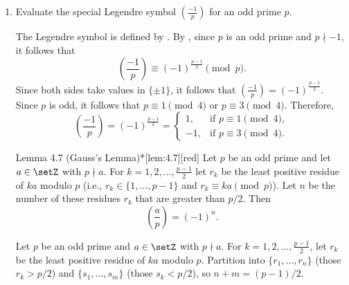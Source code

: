 \begin{enumerate}
  \newpage
  \begin{define}{Theorem 4.4 (Euler's Criterion)*}[thm:4.4][red]
    Let $p$ be an odd prime and let $a\in\setZ$ with $p\nmid a$. Then
    \[
    \left(\frac{a}{p}\right) \equiv a^{\frac{p-1}{2}} \pmod p,
    \]
    and, since both sides take values in $\{\pm1\}$, we may (and usually do) interpret this congruence as the equality
    \[
    \left(\frac{a}{p}\right) = a^{\frac{p-1}{2}} \pmod p \in\{1,-1\}.
    \]
    \begin{subprove}
      If $\left(\frac{a}{p}\right)=1$, there exists $x_0$ with $x_0^2\equiv a\pmod p$. Then
      \[
      a^{\frac{p-1}{2}} \equiv (x_0^2)^{\frac{p-1}{2}} \equiv x_0^{\,p-1}\equiv 1\pmod p
      \]
      by Fermat's little theorem.
      If $\left(\frac{a}{p}\right)=-1$, the nonzero residues $\{1,2,\dots,p-1\}$ partition into $(p-1)/2$ pairs with product $a$: if $i^2\equiv a\pmod p$ for some $i$, then $a$ is a residue, contradiction. Hence $(p-1)!\equiv a^{\frac{p-1}{2}} \pmod p$. By Wilson's theorem, $(p-1)!\equiv -1\pmod p$, so $a^{\frac{p-1}{2}}\equiv -1\pmod p$.
    \end{subprove}
  \end{define}
  \item\label{thm:4.6} Evaluate the special Legendre symbol $\left(\frac{-1}{p}\right)$ for an odd prime $p$.
  \begin{subprove}
    The Legendre symbol is defined by .
    By , since $p$ is an odd prime and $p \nmid -1$, it follows that
    \[
    \left(\frac{-1}{p}\right)\equiv (-1)^{\frac{p-1}{2}}\pmod p.
    \]
    Since both sides take values in $\{\pm1\}$, it follows that $\left(\frac{-1}{p}\right)=(-1)^{\frac{p-1}{2}}$.
    Since $p$ is odd, it follows that $p \equiv 1 \pmod{4}$ or $p \equiv 3 \pmod{4}$.
    Therefore, 
      \[
      \left(\frac{-1}{p}\right)=(-1)^{\frac{p-1}{2}}=
      \begin{cases}
      1, & \text{if } p\equiv 1\pmod 4,\\[4pt]
      -1,& \text{if } p\equiv 3\pmod 4.
      \end{cases}
      \]
  \end{subprove}




  \newpage
  \begin{define}{Lemma 4.7 (Gauss's Lemma)*}[lem:4.7][red]
    Let $p$ be an odd prime and let $a\in\setZ$ with $p\nmid a$. For $k=1,2,\dots,\frac{p-1}{2}$ let $r_k$ be the least positive residue of $ka$ modulo $p$ (i.e., $r_k\in\{1,\dots,p-1\}$ and $r_k\equiv ka\pmod p$). Let $n$ be the number of these residues $r_k$ that are greater than $p/2$. Then
    \[
    \left(\frac{a}{p}\right)=(-1)^n.
    \]
    \begin{subprove}
    Let $p$ be an odd prime and $a\in\setZ$ with $p\nmid a$. For $k=1,2,\dots,\frac{p-1}{2}$, let $r_k$ be the least positive residue of $ka$ modulo $p$. Partition into $\{r_1,\dots,r_n\}$ (those $r_k>p/2$) and $\{s_1,\dots,s_m\}$ (those $s_k<p/2$), so $n+m=(p-1)/2$.
  

\end{subprove}
\end{define}
\end{enumerate}
